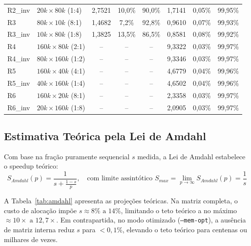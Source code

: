 \begin{table}[H]
{\begin{tabular}{@{}ll|ccc|ccc@{}}
R2\_inv         & $20k \times 80k$ (1:4) & 2{,}7521 & 10{,}0\% & 90{,}0\% & 1{,}7141 & 0{,}05\% & 99{,}95\% \\
R3              & $80k \times 10k$ (8:1) & 1{,}4682 & 7{,}2\%  & 92{,}8\% & 0{,}9610 & 0{,}07\% & 99{,}93\% \\
R3\_inv         & $10k \times 80k$ (1:8) & 1{,}3825 & 13{,}5\% & 86{,}5\% & 0{,}8581 & 0{,}08\% & 99{,}92\% \\
R4              & $160k \times 80k$ (2:1)& --       & --       & --       & 9{,}3322 & 0{,}03\% & 99{,}97\% \\
R4\_inv         & $80k \times 160k$ (1:2)& --       & --       & --       & 9{,}3346 & 0{,}03\% & 99{,}97\% \\
R5              & $160k \times 40k$ (4:1)& --       & --       & --       & 4{,}6779 & 0{,}04\% & 99{,}96\% \\
R5\_inv         & $40k \times 160k$ (1:4)& --       & --       & --       & 4{,}6502 & 0{,}04\% & 99{,}96\% \\
R6              & $160k \times 20k$ (8:1)& --       & --       & --       & 2{,}3358 & 0{,}03\% & 99{,}97\% \\
R6\_inv         & $20k \times 160k$ (1:8)& --       & --       & --       & 2{,}0905 & 0{,}03\% & 99{,}97\% \\ \bottomrule
\end{tabular}%
}
\end{table}

\subsection{Estimativa Teórica pela Lei de Amdahl}
\label{sec:amdahl}

Com base na fração puramente sequencial $s$ medida, a Lei de Amdahl estabelece o speedup teórico:
\begin{equation}
S_{Amdahl}(p) = \frac{1}{s + \frac{1 - s}{p}}, \quad \text{com limite assintótico } S_{max} = \lim_{p \to \infty} S_{Amdahl}(p) = \frac{1}{s}
\label{eq:amdahl}
\end{equation}

A Tabela~\ref{tab:amdahl} apresenta as projeções teóricas. Na matriz completa, o custo de alocação impõe $s \approx 8\% \text{ a } 14\%$, limitando o teto teórico a no máximo $\approx 10\times \text{ a } 12{,}7\times$. Em contrapartida, no modo otimizado (\texttt{--mem-opt}), a ausência de matriz interna reduz $s$ para $<0{,}1\%$, elevando o teto teórico para centenas ou milhares de vezes.

